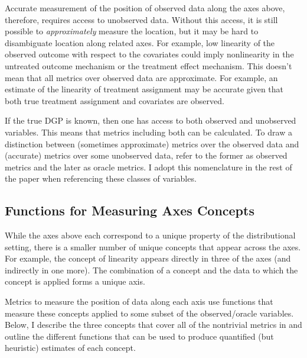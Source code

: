 \documentclass[../main.tex]{subfiles}
\begin{document}
\vspace{\baselineskip}

Accurate measurement of the position of observed data along the axes above, therefore, requires access to unobserved data. Without this access, it is still possible to \textit{approximately} measure the location, but it may be hard to disambiguate location along related axes. For example, low linearity of the observed outcome with respect to the covariates could imply nonlinearity in the untreated outcome mechanism or the treatment effect mechanism. This doesn't mean that all metrics over observed data are approximate. For example, an estimate of the linearity of treatment assignment may be accurate given that both true treatment assignment and covariates are observed.

\vspace{\baselineskip}

If the true DGP is known, then one has access to both observed and unobserved variables. This means that metrics including both can be calculated. To draw a distinction between (sometimes approximate) metrics over the observed data and (accurate) metrics over some unobserved data, \textcite{Dorie2019Automated1} refer to the former as observed metrics and the later as oracle metrics. I adopt this nomenclature in the rest of the paper when referencing these classes of variables.

\subsection{Functions for Measuring Axes Concepts}

While the axes above each correspond to a unique property of the distributional setting, there is a smaller number of unique concepts that appear across the axes. For example, the concept of linearity appears directly in three of the axes (and indirectly in one more). The combination of a concept and the data to which the concept is applied forms a unique axis.

\vspace{\baselineskip}

Metrics to measure the position of data along each axis use functions that measure these concepts applied to some subset of the observed/oracle variables. Below, I describe the three concepts that cover all of the nontrivial metrics in \textcite{Dorie2019Automated1} and outline the different functions that can be used to produce quantified (but heuristic) estimates of each concept.
\end{document}
